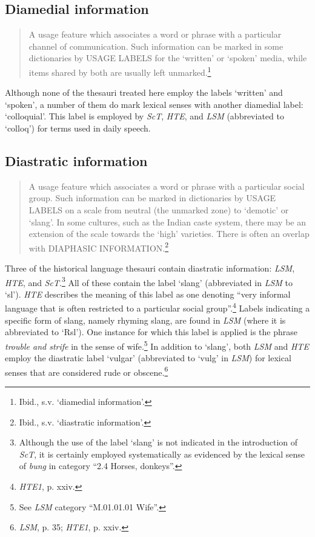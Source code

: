 \subsection*{Diamedial information}
\begin{quotation} \noindent
A usage feature which associates a word or phrase with a particular channel of communication. Such information can be marked in some dictionaries by USAGE LABELS for the `written' or `spoken' media, while items shared by both are usually left unmarked.\footnote{%
Ibid., s.v. `diamedial information'.}
\end{quotation}
Although none of the thesauri treated here employ the labels `written' and `spoken', a number of them do mark lexical senses with another diamedial label: `colloquial'. This label is employed by \textit{ScT}, \textit{HTE}, and \textit{LSM} (abbreviated to `colloq') for terms used in daily speech.

\subsection*{Diastratic information}
\begin{quotation} \noindent
A usage feature which associates a word or phrase with a particular social group. Such information can be marked in dictionaries by USAGE LABELS on a scale from neutral (the unmarked zone) to `demotic' or `slang'. In some cultures, such as the Indian caste system, there may be an extension of the scale towards the `high' varieties. There is often an overlap with DIAPHASIC INFORMATION.\footnote{%
Ibid., s.v. `diastratic information'.}
\end{quotation}
Three of the historical language thesauri contain diastratic information: \textit{LSM}, \textit{HTE}, and \textit{ScT}.\footnote{Although the use of the label `slang' is not indicated in the introduction of \textit{ScT}, it is certainly employed systematically as evidenced by the lexical sense of \textit{bung} in category ``2.4 Horses, donkeys''.} All of these contain the label `slang' (abbreviated in \textit{LSM} to `sl'). \textit{HTE} describes the meaning of this label as one denoting ``very informal language that is often restricted to a particular social group''.\footnote{\textit{HTE1}, p. xxiv.} Labels indicating a specific form of slang, namely rhyming slang, are found in \textit{LSM} (where it is abbreviated to `Rsl'). One instance for which this label is applied is the phrase \textit{trouble and strife} in the sense of wife.\footnote{See \textit{LSM} category ``M.01.01.01 Wife''.} In addition to `slang', both \textit{LSM} and \textit{HTE} employ the diastratic label `vulgar' (abbreviated to `vulg' in \textit{LSM}) for lexical senses that are considered rude or obscene.\footnote{\textit{LSM}, p. 35; \textit{HTE1}, p. xxiv.}

